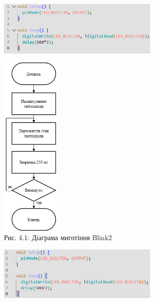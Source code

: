 \documentclass[a4paper]{article}
\begin{document}
\begin{figure}[h]
  \centering
  \includegraphics[width=0.7\textwidth]{imgs/LW4_1.png}
\end{figure} 

\begin{figure}[h]
    \centering
    \includegraphics[width=0.25\textwidth]{imgs/LW4.0.1.drawio.png}
    \caption*{Рис. 4.1: Діаграма миготіння Blink2}
\end{figure} 

\newpage 

\begin{figure}[h]
  \centering
  \includegraphics[width=0.7\textwidth]{imgs/LW4_2.png}
\end{figure} 
\end{document}
